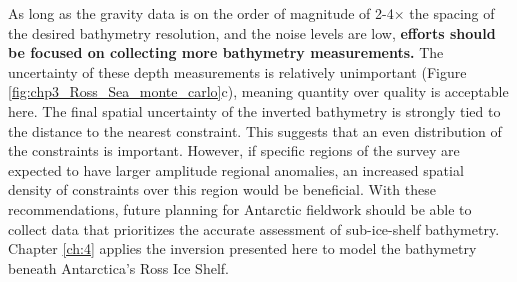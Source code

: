 As long as the gravity data is on the order of magnitude of 2-4$\times$ the spacing of the desired bathymetry resolution, and the noise levels are low, \textbf{efforts should be focused on collecting more bathymetry measurements.} The uncertainty of these depth measurements is relatively unimportant (Figure \ref{fig:chp3_Ross_Sea_monte_carlo}c), meaning quantity over quality is acceptable here. The final spatial uncertainty of the inverted bathymetry is strongly tied to the distance to the nearest constraint. This suggests that an even distribution of the constraints is important. However, if specific regions of the survey are expected to have larger amplitude regional anomalies, an increased spatial density of constraints over this region would be beneficial. With these recommendations, future planning for Antarctic fieldwork should be able to collect data that prioritizes the accurate assessment of sub-ice-shelf bathymetry.  \\

Chapter \ref{ch:4} applies the inversion presented here to model the bathymetry beneath Antarctica's Ross Ice Shelf. 
